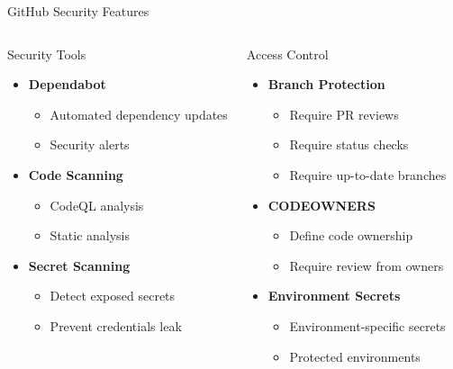 \documentclass[aspectratio=169]{beamer}
\begin{document}
	\begin{frame}{GitHub Security Features}
		\begin{columns}[T]
			\begin{block}{Security Tools}
				\begin{itemize}
					\item \textbf{Dependabot}
					\begin{itemize}
						\item Automated dependency updates
						\item Security alerts
					\end{itemize}
					\item \textbf{Code Scanning}
					\begin{itemize}
						\item CodeQL analysis
						\item Static analysis
					\end{itemize}
					\item \textbf{Secret Scanning}
					\begin{itemize}
						\item Detect exposed secrets
						\item Prevent credentials leak
					\end{itemize}
				\end{itemize}
			\end{block}
			
			\begin{block}{Access Control}
				\begin{itemize}
					\item \textbf{Branch Protection}
					\begin{itemize}
						\item Require PR reviews
						\item Require status checks
						\item Require up-to-date branches
					\end{itemize}
					\item \textbf{CODEOWNERS}
					\begin{itemize}
						\item Define code ownership
						\item Require review from owners
					\end{itemize}
					\item \textbf{Environment Secrets}
					\begin{itemize}
						\item Environment-specific secrets
						\item Protected environments
					\end{itemize}
				\end{itemize}
			\end{block}
		\end{columns}
	\end{frame}
	
\end{document}
